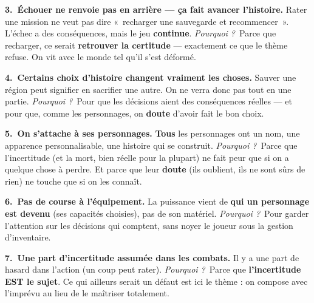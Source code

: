 \documentclass[11pt,a4paper]{article}
\newcommand{\pourquoi}{\textit{\textcolor{accent2}{Pourquoi ?}}\ }
\begin{document}
\smallskip
\textbf{3.~Échouer ne renvoie pas en arrière --- ça fait avancer l'histoire.}
Rater une mission ne veut pas dire «~recharger une sauvegarde et recommencer~». L'échec a des conséquences, mais le jeu \textbf{continue}. \pourquoi Parce que recharger, ce serait \textbf{retrouver la certitude} --- exactement ce que le thème refuse. On vit avec le monde tel qu'il s'est déformé.

\smallskip
\textbf{4.~Certains choix d'histoire changent vraiment les choses.}
Sauver une région peut signifier en sacrifier une autre. On ne verra donc pas tout en une partie. \pourquoi Pour que les décisions aient des conséquences réelles --- et pour que, comme les personnages, on \textbf{doute} d'avoir fait le bon choix.

\smallskip
\textbf{5.~On s'attache à ses personnages.}
\textbf{Tous} les personnages ont un nom, une apparence personnalisable, une histoire qui se construit. \pourquoi Parce que l'incertitude (et la mort, bien réelle pour la plupart) ne fait peur que si on a quelque chose à perdre. Et parce que leur \textbf{doute} (ils oublient, ils ne sont sûrs de rien) ne touche que si on les connaît.

\smallskip
\textbf{6.~Pas de course à l'équipement.}
La puissance vient de \textbf{qui un personnage est devenu} (ses capacités choisies), pas de son matériel. \pourquoi Pour garder l'attention sur les décisions qui comptent, sans noyer le joueur sous la gestion d'inventaire.

\smallskip
\textbf{7.~Une part d'incertitude assumée dans les combats.}
Il y a une part de hasard dans l'action (un coup peut rater). \pourquoi Parce que \textbf{l'incertitude EST le sujet}. Ce qui ailleurs serait un défaut est ici le thème : on compose avec l'imprévu au lieu de le maîtriser totalement.

\end{document}

